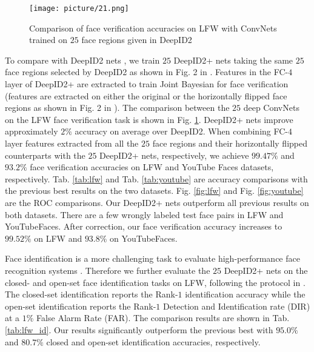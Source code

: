 \documentclass[10pt,twocolumn,letterpaper]{article}
\begin{document}
\begin{figure}[t]
\begin{center}
\texttt{[image: picture/21.png]}
\end{center}
\vspace{-0.15in}
\caption{Comparison of face verification accuracies on LFW with ConvNets trained on $25$ face regions given in DeepID2 \cite{sun2014b}}
\label{fig:net25_noflip}
\vspace{-0.1in}
\end{figure}

To compare with DeepID2 nets \cite{sun2014b}, we train $25$ DeepID2+ nets taking the same $25$ face regions selected by DeepID2 as shown in Fig. 2 in \cite{sun2014b}. Features in the FC-$4$ layer of DeepID2+ are extracted to train Joint Bayesian for face verification (features are extracted on either the original or the horizontally flipped face regions as shown in Fig. 2 in \cite{sun2014b}). The comparison between the $25$ deep ConvNets on the LFW face verification task is shown in Fig. \ref{fig:net25_noflip}. DeepID2+ nets improve approximately $2\%$ accuracy on average over DeepID2. When combining FC-$4$ layer features extracted from all the $25$ face regions and their horizontally flipped counterparts with the $25$ DeepID2+ nets, respectively, we achieve $\bm{99.47\%}$ and $\bm{93.2\%}$ face verification accuracies on LFW and YouTube Faces datasets, respectively. Tab. \ref{tab:lfw} and Tab. \ref{tab:youtube} are accuracy comparisons with the previous best results on the two datasets. Fig. \ref{fig:lfw} and Fig. \ref{fig:youtube} are the  ROC  comparisons. Our DeepID2+ nets outperform all previous results on both datasets. There are a few wrongly labeled test face pairs in LFW and YouTubeFaces. After correction, our face verification accuracy  increases  to $99.52\%$ on LFW and $93.8\%$ on YouTubeFaces.

Face identification is a more challenging task to evaluate high-performance face recognition systems \cite{taigman2014b}. Therefore we further evaluate the $25$ DeepID2+ nets on the closed- and open-set face identification tasks on LFW, following the protocol  in \cite{best-rowden2014}. The closed-set identification reports the Rank-$1$ identification accuracy while the open-set identification  reports the Rank-$1$ Detection and Identification rate (DIR) at a $1\%$ False Alarm Rate (FAR). The comparison results are shown in Tab. \ref{tab:lfw_id}. Our results significantly outperform the previous best \cite{taigman2014b} with $\bm{95.0\%}$ and $\bm{80.7\%}$ closed and open-set identification accuracies, respectively.
\end{document}
